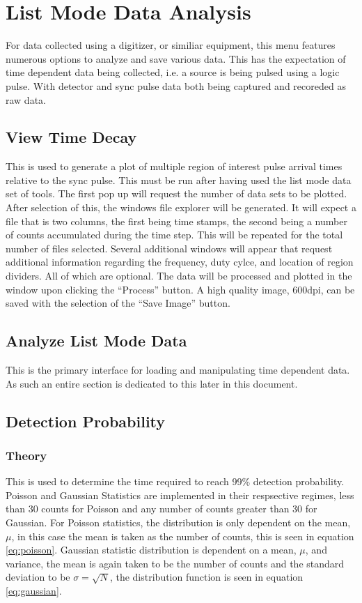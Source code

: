 \section{List Mode Data Analysis}
	For data collected using a digitizer, or similiar equipment, this menu features numerous options to analyze and save various data. This has the expectation of time dependent data being collected, i.e. a source is being pulsed using a logic pulse. With detector and sync pulse data both being captured and recoreded as raw data.
		\subsection{View Time Decay}
			This is used to generate a plot of multiple region of interest pulse arrival times relative to the sync pulse. This must be run after having used the list mode data set of tools. The first pop up will request the number of data sets to be plotted. After selection of this, the windows file explorer will be generated. It will expect a file that is two columns, the first being time stamps, the second being a number of counts accumulated during the time step. This will be repeated for the total number of files selected. Several additional windows will appear that request additional information regarding the frequency, duty cylce, and location of region dividers. All of which are optional. The data will be processed and plotted in the window upon clicking the ``Process'' button. A high quality image, 600dpi, can be saved with the selection of the ``Save Image'' button.

	\subsection{Analyze List Mode Data}
		This is the primary interface for loading and manipulating time dependent data. As such an entire section is dedicated to this later in this document.
		
	\subsection{Detection Probability}
		\subsubsection{Theory}
		This is used to determine the time required to reach 99\% detection probability. Poisson and Gaussian Statistics are implemented in their respsective regimes, less than 30 counts for Poisson and any number of counts greater than 30 for Gaussian. For Poisson statistics, the distribution is only dependent on the mean, $\mu$, in this case the mean is taken as the number of counts, this is seen in equation \ref{eq:poisson}. Gaussian statistic distribution is dependent on a mean, $\mu$, and variance, the mean is again taken to be the number of counts and the standard deviation to be $\sigma=\sqrt{N}$, the distribution function is seen in equation \ref{eq:gaussian}.

